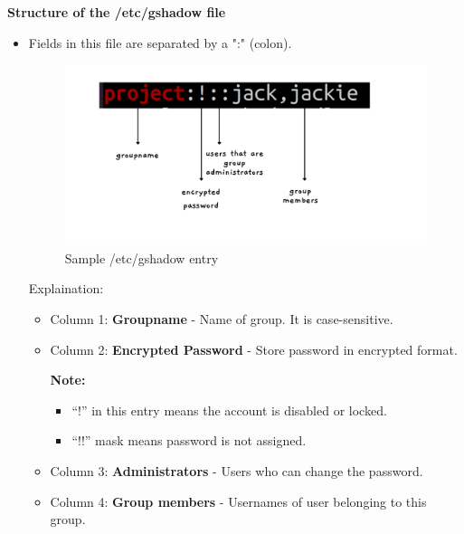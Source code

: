 \begin{flushleft}
\newpage
\textbf{Structure of the /etc/gshadow file}
\begin{itemize}
	\item Fields in this file are separated by a ":" (colon).
	\begin{figure}[h!]
		\centering
		\includegraphics[scale=.2]{content/chapter4/images/56.png}
		\caption{Sample /etc/gshadow entry}
		\label{fig:user_group}
	\end{figure}	
	\newline
	Explaination:
	\begin{itemize}
		\item Column 1: \textbf{Groupname} - Name of group. It is case-sensitive. 
		\item Column 2: \textbf{Encrypted Password} - Store password in encrypted format.
		\bigskip
		\begin{tcolorbox}[breakable,notitle,boxrule=-0pt,colback=yellow,colframe=yellow]
			\color{black}
			\textbf{Note:} 
			\begin{itemize}
				\item {“!”} in this entry means the account is disabled or locked. 
				\item {“!!”} mask means password is not assigned.
			\end{itemize}
		\end{tcolorbox}

		\item Column 3: \textbf{Administrators} - Users who can change the password.
		\item Column 4: \textbf{Group members} - Usernames of user belonging to this group.
	\end{itemize}	
\end{itemize}	

	
\end{flushleft}

\newpage

